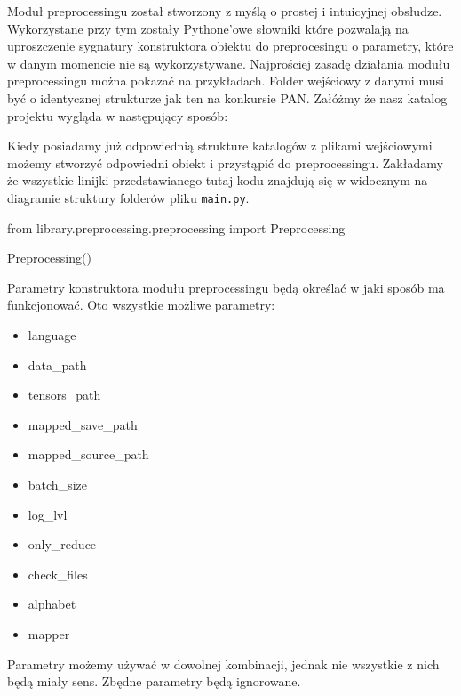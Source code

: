 Moduł preprocessingu został stworzony z myślą o prostej i intuicyjnej obsłudze. Wykorzystane przy
tym zostały Pythone'owe słowniki które pozwalają na uproszczenie sygnatury konstruktora obiektu do preprocesingu
o parametry, które w danym momencie nie są wykorzystywane. Najprościej zasadę działania modułu preprocessingu można 
pokazać na przykładach. Folder wejściowy z danymi musi być o identycznej strukturze jak ten na 
konkursie PAN.
Załóżmy że nasz katalog projektu wygląda w następujący sposób:


\myspace
{}
\myspace

Kiedy posiadamy już odpowiednią strukture katalogów z plikami wejściowymi możemy stworzyć 
odpowiedni obiekt i przystąpić do preprocessingu. Zakładamy że wszystkie linijki przedstawianego 
tutaj kodu znajdują się w widocznym na diagramie struktury folderów pliku \texttt{main.py}.

\begin{python}
from library.preprocessing.preprocessing import Preprocessing

Preprocessing()

\end{python}

Parametry konstruktora modułu preprocessingu będą określać w jaki sposób ma funkcjonować. 
Oto wszystkie możliwe parametry:
\begin{itemize}
	\item language
	\item data\_path
	\item tensors\_path
	\item mapped\_save\_path
	\item mapped\_source\_path
	\item batch\_size
	\item log\_lvl
	\item only\_reduce
	\item check\_files
	\item alphabet
	\item mapper
\end{itemize}

Parametry możemy używać w dowolnej kombinacji, jednak nie wszystkie z nich będą miały sens. Zbędne
parametry będą ignorowane.


